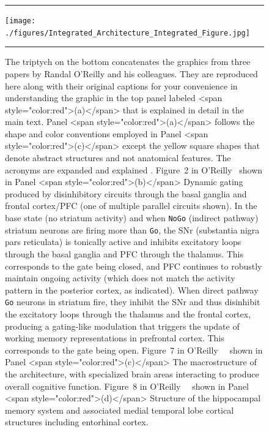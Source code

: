 \begin{figure}
%
  \hrule{}
%
  \begin{center}
    \texttt{[image: ./figures/Integrated\_Architecture\_Integrated\_Figure.jpg]}
  \end{center}
%
  \caption{The triptych on the bottom concatenates the graphics from three papers by Randal O'Reilly and his colleagues. They are reproduced here along with their original captions for your convenience in understanding the graphic in the top panel labeled {\rawhtml<span style="color:red">(a)</span>\endrawhtml} that is explained in detail in the main text. Panel {\rawhtml<span style="color:red">(a)</span>\endrawhtml} follows the shape and color conventions employed in Panel {\rawhtml<span style="color:red">(c)</span>\endrawhtml} except the yellow square shapes that denote abstract structures and not anatomical features. The acronyms are expanded and explained {}.
    Figure~2 in O'Reilly~\cite{OReillySCIENCE-06} shown in Panel {\rawhtml<span style="color:red">(b)</span>\endrawhtml} \emdash{} Dynamic gating produced by disinhibitory circuits through the basal ganglia and frontal cortex/PFC (one of multiple parallel circuits shown).  In the base state (no striatum activity) and when {\tt{NoGo}} (indirect pathway) striatum neurons are firing more than {\tt{Go}}, the SNr (substantia nigra pars reticulata) is tonically active and inhibits excitatory loops through the basal ganglia and PFC through the thalamus. This corresponds to the gate being closed, and PFC continues to robustly maintain ongoing activity (which does not match the activity pattern in the posterior cortex, as indicated). When direct pathway {\tt{Go}} neurons in striatum fire, they inhibit the SNr and thus disinhibit the excitatory loops through the thalamus and the frontal cortex, producing a gating-like modulation that triggers the update of working memory representations in prefrontal cortex. This corresponds to the gate being open.
    Figure~7 in O'Reilly~\etal{}~\cite{OReillyetalLEABRA-16} shown in Panel {\rawhtml<span style="color:red">(c)</span>\endrawhtml} \emdash{} The macrostructure of the {} architecture, with specialized brain areas interacting to produce overall cognitive function.
    Figure~8 in O'Reilly~\etal{}~\cite{OReillyetalLEABRA-16} shown in Panel {\rawhtml<span style="color:red">(d)</span>\endrawhtml} \emdash{} Structure of the hippocampal memory system and associated medial temporal lobe cortical structures including entorhinal cortex.}
%
  \hrule{}
%
\end{figure}

